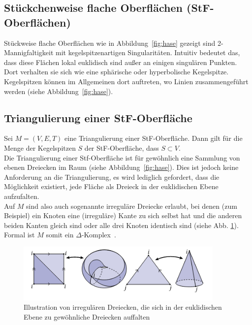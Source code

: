 \subsection*{Stückchenweise flache Oberflächen (StF-Oberflächen)}

Stückweise flache Oberflächen wie in Abbildung~\ref{fig:hase} gezeigt sind 2-Mannigfaltigkeit mit kegelspitzenartigen Singularitäten. Intuitiv bedeutet das, dass diese Flächen lokal euklidisch sind außer an einigen singulären Punkten. Dort verhalten sie sich wie eine sphärische oder hyperbolische Kegelspitze. Kegelspitzen können im Allgemeinen dort auftreten, wo Linien zusammengeführt werden (siehe Abbildung~\ref{fig:hase}).

\subsection*{Triangulierung  einer  StF-Oberfläche}
Sei $M = (V,E,T)$ eine Triangulierung einer StF-Oberfläche. Dann gilt für die Menge der Kegelspitzen $S$ der StF-Oberfläche, dass $S \subset V$.\\ 
 
Die Triangulierung einer Stf-Oberfläche ist für gewöhnlich eine Sammlung von ebenen Dreiecken im Raum (siehe Abbildung~\ref{fig:hase}). Dies ist jedoch keine Anforderung an die Triangulierung, es wird lediglich gefordert, dass die Möglichkeit existiert, jede Fläche als Dreieck in der euklidischen Ebene aufzufalten. \\  

Auf $M$ sind also auch sogenannte irreguläre Dreiecke erlaubt, bei denen (zum Beispiel) ein Knoten eine (irreguläre) Kante zu sich selbst hat und die anderen beiden Kanten gleich sind oder alle drei Knoten identisch sind (siehe Abb. \ref{fig:auffaltung_irregulaer}).
Formal ist $M$  somit ein $\Delta$-Komplex~\cite[Abschnitt 2.1]{hatcher:2005:deltakomplex}.\\
 
\begin{figure}[H]%
    \centering
  \includegraphics[width=4in]{images/auffaltung_irregulaer.png}
  \caption{Illustration von irregulären Dreiecken, die sich in der  euklidischen Ebene zu gewöhnliche Dreiecken auffalten~\cite{Sharp:2019:NIT}}
\label{fig:auffaltung_irregulaer}
\end{figure}


